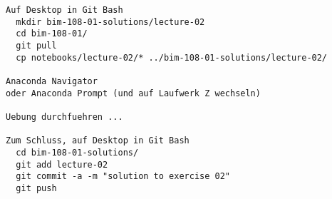 \documentclass{beamer}
\begin{document}
\begin{frame}[fragile]
  
  \small
  \begin{lstlisting}
Auf Desktop in Git Bash
  mkdir bim-108-01-solutions/lecture-02
  cd bim-108-01/
  git pull
  cp notebooks/lecture-02/* ../bim-108-01-solutions/lecture-02/

Anaconda Navigator 
oder Anaconda Prompt (und auf Laufwerk Z wechseln)

Uebung durchfuehren ...

Zum Schluss, auf Desktop in Git Bash
  cd bim-108-01-solutions/
  git add lecture-02
  git commit -a -m "solution to exercise 02"
  git push
  \end{lstlisting}
  
\end{frame}
\end{document}
